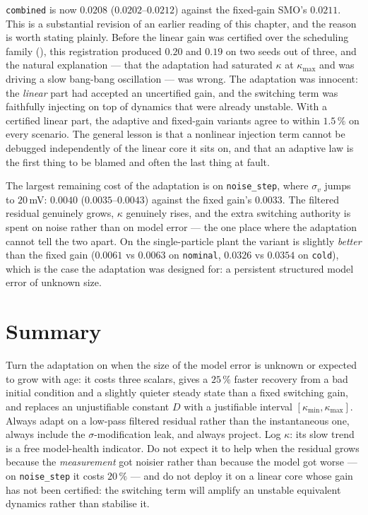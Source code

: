 \texttt{combined} is now $0.0208$ ($0.0202$--$0.0212$) against the fixed-gain SMO's $0.0211$.
This is a substantial revision of an earlier reading of this chapter, and the reason is worth
stating plainly.  Before the linear gain was certified over the scheduling family
(), this registration produced $0.20$ and $0.19$ on two seeds out of
three, and the natural explanation --- that the adaptation had saturated $\kappa$ at
$\kappa_{\max}$ and was driving a slow bang-bang oscillation --- was wrong.  The adaptation was
innocent: the \emph{linear} part had accepted an uncertified gain, and the switching term was
faithfully injecting on top of dynamics that were already unstable.  With a certified linear
part, the adaptive and fixed-gain variants agree to within $1.5\,\%$ on every scenario.  The
general lesson is that a nonlinear injection term cannot be debugged independently of the linear
core it sits on, and that an adaptive law is the first thing to be blamed and often the last
thing at fault.

The largest remaining cost of the adaptation is on \texttt{noise\_step}, where $\sigma_v$ jumps
to $20$\,mV: $0.0040$ ($0.0035$--$0.0043$) against the fixed gain's $0.0033$.  The filtered
residual genuinely grows, $\kappa$ genuinely rises, and the extra switching authority is spent on
noise rather than on model error --- the one place where the adaptation cannot tell the two
apart.  On the single-particle plant the variant is slightly \emph{better} than the fixed gain
($0.0061$ vs $0.0063$ on \texttt{nominal}, $0.0326$ vs $0.0354$ on \texttt{cold}), which is the
case the adaptation was designed for: a persistent structured model error of unknown size.

\section{Summary}
Turn the adaptation on when the size of the model error is unknown or expected to grow with age:
it costs three scalars, gives a $25\,\%$ faster recovery from a bad initial condition and a
slightly quieter steady state than a fixed switching gain, and replaces an unjustifiable constant
$D$ with a justifiable interval $[\kappa_{\min},\kappa_{\max}]$.  Always adapt on a low-pass
filtered residual rather than the instantaneous one, always include the $\sigma$-modification
leak, and always project.  Log $\kappa$: its slow trend is a free model-health indicator.  Do not
expect it to help when the residual grows because the \emph{measurement} got noisier rather than
because the model got worse --- on \texttt{noise\_step} it costs $20\,\%$ --- and do not deploy
it on a linear core whose gain has not been certified: the switching term will amplify an
unstable equivalent dynamics rather than stabilise it.
